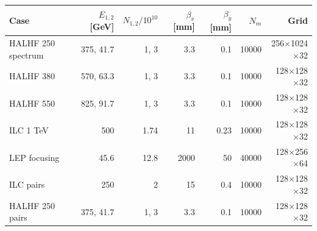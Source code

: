 \begin{tabular}{@{}lrrrrrr@{}}
\toprule
Case & $E_{1,2}$ [GeV] & $N_{1,2}/10^{10}$ & $\beta_x$ [mm] & $\beta_y$ [mm] & $N_m$ & Grid\\
\midrule
HALHF 250 spectrum & 375, 41.7 & 1, 3 & 3.3 & 0.1 & 10000 & 256$\times$1024$\times$32\\
HALHF 380 & 570, 63.3 & 1, 3 & 3.3 & 0.1 & 10000 & 128$\times$128$\times$32\\
HALHF 550 & 825, 91.7 & 1, 3 & 3.3 & 0.1 & 10000 & 128$\times$128$\times$32\\
ILC 1 TeV & 500 & 1.74 & 11 & 0.23 & 10000 & 128$\times$128$\times$32\\
LEP focusing & 45.6 & 12.8 & 2000 & 50 & 40000 & 128$\times$256$\times$64\\
ILC pairs & 250 & 2 & 15 & 0.4 & 10000 & 128$\times$128$\times$32\\
HALHF 250 pairs & 375, 41.7 & 1, 3 & 3.3 & 0.1 & 10000 & 128$\times$128$\times$32\\
\bottomrule
\end{tabular}
